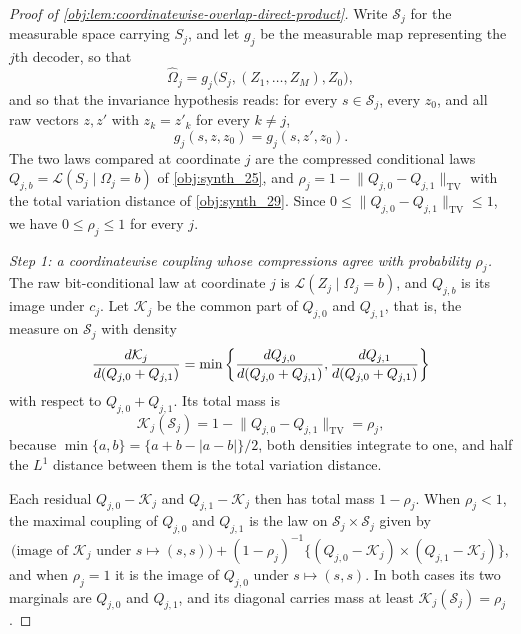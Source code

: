 \begin{proof}[Proof of \cref{obj:lem:coordinatewise-overlap-direct-product}]
Write \(\mathcal S_j\) for the measurable space carrying \(S_j\), and let \(g_j\) be the measurable map representing the \(j\)th decoder, so that
\[
\widehat\Omega_j=g_j\bigl(S_j,(Z_1,\ldots,Z_M),Z_0\bigr),
\]
and so that the invariance hypothesis reads: for every \(s\in\mathcal S_j\), every \(z_0\), and all raw vectors \(z,z'\) with \(z_k=z'_k\) for every \(k\neq j\),
\[
g_j(s,z,z_0)=g_j(s,z',z_0).
\]
The two laws compared at coordinate \(j\) are the compressed conditional laws \(Q_{j,b}=\mathcal L(S_j\mid\Omega_j=b)\) of \cref{obj:synth_25}, and \(\rho_j=1-\lVert Q_{j,0}-Q_{j,1}\rVert_{\mathrm{TV}}\) with the total variation distance of \cref{obj:synth_29}. Since \(0\leq\lVert Q_{j,0}-Q_{j,1}\rVert_{\mathrm{TV}}\leq1\), we have \(0\leq\rho_j\leq1\) for every \(j\).

\emph{Step 1: a coordinatewise coupling whose compressions agree with probability \(\rho_j\).}
The raw bit-conditional law at coordinate \(j\) is \(\mathcal L(Z_j\mid\Omega_j=b)\), and \(Q_{j,b}\) is its image under \(c_j\). Let \(\mathcal K_j\) be the common part of \(Q_{j,0}\) and \(Q_{j,1}\), that is, the measure on \(\mathcal S_j\) with density
\[
{d\mathcal K_j\over d(Q_{j,0}+Q_{j,1})}
=
\min\left\{
{dQ_{j,0}\over d(Q_{j,0}+Q_{j,1})},
{dQ_{j,1}\over d(Q_{j,0}+Q_{j,1})}
\right\}
\]
with respect to \(Q_{j,0}+Q_{j,1}\). Its total mass is
\[
\mathcal K_j(\mathcal S_j)=1-\lVert Q_{j,0}-Q_{j,1}\rVert_{\mathrm{TV}}=\rho_j,
\]
because \(\min\{a,b\}=\{a+b-|a-b|\}/2\), both densities integrate to one, and half the \(L^1\) distance between them is the total variation distance.

Each residual \(Q_{j,0}-\mathcal K_j\) and \(Q_{j,1}-\mathcal K_j\) then has total mass \(1-\rho_j\). When \(\rho_j<1\), the maximal coupling of \(Q_{j,0}\) and \(Q_{j,1}\) is the law on \(\mathcal S_j\times\mathcal S_j\) given by
\[
\bigl(\text{image of }\mathcal K_j\text{ under }s\mapsto(s,s)\bigr)
+
(1-\rho_j)^{-1}\bigl\{(Q_{j,0}-\mathcal K_j)\times(Q_{j,1}-\mathcal K_j)\bigr\},
\]
and when \(\rho_j=1\) it is the image of \(Q_{j,0}\) under \(s\mapsto(s,s)\). In both cases its two marginals are \(Q_{j,0}\) and \(Q_{j,1}\), and its diagonal carries mass at least \(\mathcal K_j(\mathcal S_j)=\rho_j\).


\end{proof}
